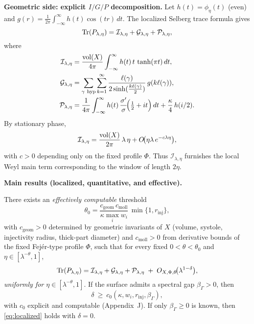 \medskip
\noindent\textbf{Geometric side: explicit $I/G/P$ decomposition.}
Let $h(t)=\phi_\eta(t)$ (even) and $g(r)=\frac{1}{2\pi}\int_{-\infty}^{\infty}h(t)\cos(tr)\,dt$. The localized Selberg trace formula gives
\begin{equation}\label{eq:IGP}
\operatorname{Tr}(P_{\lambda,\eta}) = \mathcal{I}_{\lambda,\eta}+\mathcal{G}_{\lambda,\eta}+\mathcal{P}_{\lambda,\eta},
\end{equation}
where
\begin{align}
\mathcal{I}_{\lambda,\eta} &= \frac{\vol(X)}{4\pi}\int_{-\infty}^{\infty} h(t)\,t\,\tanh(\pi t)\,dt, \label{eq:I}\\
\mathcal{G}_{\lambda,\eta} &= \sum_{\gamma\ \mathrm{hyp}}\sum_{k=1}^{\infty} 
\frac{\ell(\gamma)}{2\sinh(\tfrac{k\ell(\gamma)}{2})}\, g(k\ell(\gamma)), \label{eq:G}\\
\mathcal{P}_{\lambda,\eta} &= \frac{1}{4\pi}\int_{-\infty}^{\infty} h(t)\,\frac{\sigma'}{\sigma}\!\Big(\tfrac12+it\Big)\,dt + \frac{\kappa}{4}\,h(i/2).\label{eq:P}
\end{align}
By stationary phase,
\begin{equation}\label{eq:weyl-main}
\mathcal{I}_{\lambda,\eta} = \frac{\operatorname{vol}(X)}{2\pi}\,\lambda\,\eta + O\!\big(\eta\lambda\,e^{-c\lambda\eta}\big),
\end{equation}
with $c>0$ depending only on the fixed profile $\Phi$. Thus $\mathcal{I}_{\lambda,\eta}$ furnishes the local Weyl main term corresponding to the window of length $2\eta$.

\medskip
\noindent\textbf{Main results (localized, quantitative, and effective).}
\begin{theorem}\label{thm:localized}
There exists an \emph{effectively computable} threshold
\[
\theta_0=\frac{c_{\mathrm{geom}}\,c_{\mathrm{moll}}}{\kappa\max_i w_i}\,\min\{1,r_{\mathrm{inj}}\},
\]
with $c_{\mathrm{geom}}>0$ determined by geometric invariants of $X$ (volume, systole, injectivity radius, thick-part diameter) and $c_{\mathrm{moll}}>0$ from derivative bounds of the fixed Fejér-type profile $\Phi$, such that for every fixed $0<\theta<\theta_0$ and $\eta\in[\lambda^{-\theta},1]$,
\begin{equation}\label{eq:localized}
\operatorname{Tr}(P_{\lambda,\eta}) = \mathcal{I}_{\lambda,\eta}+\mathcal{G}_{\lambda,\eta}+\mathcal{P}_{\lambda,\eta} \;+\; O_{X,\Phi,\theta}\!\big(\lambda^{1-\delta}\big),
\end{equation}
\emph{uniformly for $\eta\in[\lambda^{-\theta},1]$}. If the surface admits a spectral gap $\beta_\Gamma>0$, then
\begin{equation}\label{eq:delta-gap}
\delta\ \ge\ c_0(\kappa,{w_i},r_{\mathrm{inj}},\beta_\Gamma),
\end{equation}
with $c_0$ explicit and computable (Appendix~J). If only $\beta_\Gamma\ge0$ is known, then \eqref{eq:localized} holds with $\delta=0$.
\end{theorem}

